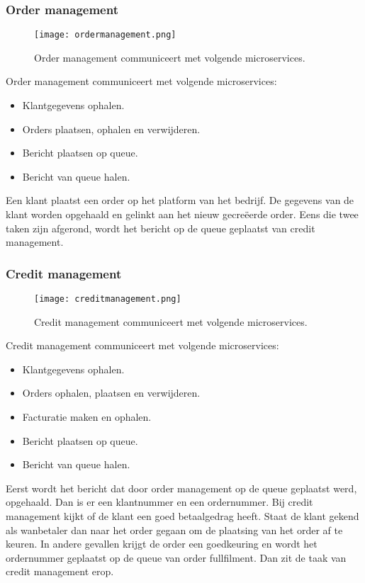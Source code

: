 \subsubsection{Order management}
\begin{figure}[h]
	\texttt{[image: ordermanagement.png]}
	\caption{Order management communiceert met volgende microservices.}
	\centering
\end{figure}
Order management communiceert met volgende microservices:
\begin{itemize}
	\item Klantgegevens ophalen.
	\item Orders plaatsen, ophalen en verwijderen.
	\item Bericht plaatsen op queue.
	\item Bericht van queue halen.
\end{itemize}
Een klant plaatst een order op het platform van het bedrijf. De gegevens van de klant worden opgehaald en gelinkt aan het nieuw gecreëerde order. Eens die twee taken zijn afgerond, wordt het bericht op de queue geplaatst van credit management.

\subsubsection{Credit management}
\begin{figure}[h]
	\texttt{[image: creditmanagement.png]}
	\caption{Credit management communiceert met volgende microservices.}
	\centering
\end{figure}
Credit management communiceert met volgende microservices:
\begin{itemize}
	\item Klantgegevens ophalen.
	\item Orders ophalen, plaatsen en verwijderen.
	\item Facturatie maken en ophalen.
	\item Bericht plaatsen op queue.
	\item Bericht van queue halen.
\end{itemize}
Eerst wordt het bericht dat door order management op de queue geplaatst werd, opgehaald. Dan is er een klantnummer en een ordernummer. Bij credit management kijkt of de klant een goed betaalgedrag heeft. Staat de klant gekend als wanbetaler dan naar het order gegaan om de plaatsing van het order af te keuren. In andere gevallen krijgt de order een goedkeuring en wordt het ordernummer geplaatst op de queue van order fullfilment. Dan zit de taak van credit management erop.

